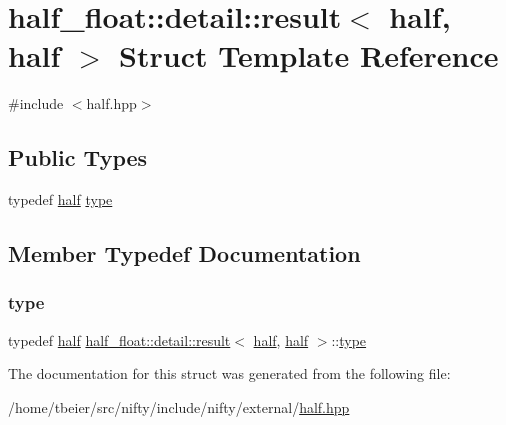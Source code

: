 \hypertarget{structhalf__float_1_1detail_1_1result_3_01half_00_01half_01_4}{}\section{half\+\_\+float\+:\+:detail\+:\+:result$<$ half, half $>$ Struct Template Reference}
\label{structhalf__float_1_1detail_1_1result_3_01half_00_01half_01_4}


{\ttfamily \#include $<$half.\+hpp$>$}

\subsection*{Public Types}
\begin{DoxyCompactItemize}
\item 
typedef \hyperlink{classhalf__float_1_1half}{half} \hyperlink{structhalf__float_1_1detail_1_1result_3_01half_00_01half_01_4_a355650e21ab1992de1511096e2d9cef3}{type}
\end{DoxyCompactItemize}


\subsection{Member Typedef Documentation}
\mbox{\label{structhalf__float_1_1detail_1_1result_3_01half_00_01half_01_4_a355650e21ab1992de1511096e2d9cef3}} 
\subsubsection{\texorpdfstring{type}{type}}
{\footnotesize\ttfamily typedef \hyperlink{classhalf__float_1_1half}{half} \hyperlink{structhalf__float_1_1detail_1_1result}{half\+\_\+float\+::detail\+::result}$<$ \hyperlink{classhalf__float_1_1half}{half}, \hyperlink{classhalf__float_1_1half}{half} $>$\+::\hyperlink{structhalf__float_1_1detail_1_1result_3_01half_00_01half_01_4_a355650e21ab1992de1511096e2d9cef3}{type}}



The documentation for this struct was generated from the following file\+:\begin{DoxyCompactItemize}
\item 
/home/tbeier/src/nifty/include/nifty/external/\hyperlink{half_8hpp}{half.\+hpp}\end{DoxyCompactItemize}
